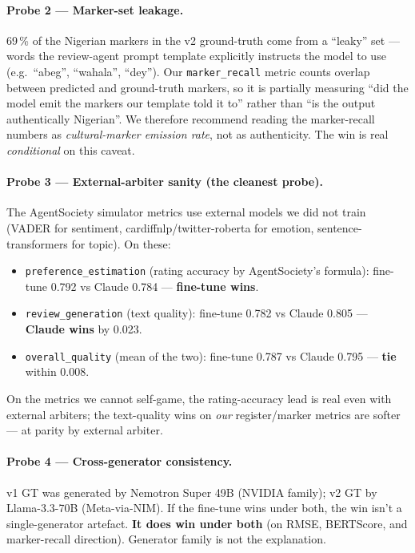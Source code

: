 \documentclass[sigconf,nonacm,balance]{acmart}
\begin{document}
\paragraph{Probe 2 --- Marker-set leakage.} 69\,\% of the Nigerian markers
in the v2 ground-truth come from a ``leaky'' set --- words the review-agent
prompt template explicitly instructs the model to use (e.g.\ ``abeg'',
``wahala'', ``dey''). Our \texttt{marker\_recall} metric counts overlap
between predicted and ground-truth markers, so it is partially measuring
``did the model emit the markers our template told it to'' rather than
``is the output authentically Nigerian''. We therefore recommend reading
the marker-recall numbers as \emph{cultural-marker emission rate}, not
as authenticity. The win is real \emph{conditional} on this caveat.

\paragraph{Probe 3 --- External-arbiter sanity (the cleanest probe).}
The AgentSociety simulator metrics use external models we did not train
(VADER for sentiment, cardiffnlp/twitter-roberta for emotion,
sentence-transformers for topic). On these:
\begin{itemize}[leftmargin=*]
    \item \texttt{preference\_estimation} (rating accuracy by AgentSociety's
          formula): fine-tune 0.792 vs Claude 0.784 --- \textbf{fine-tune wins}.
    \item \texttt{review\_generation} (text quality):
          fine-tune 0.782 vs Claude 0.805 --- \textbf{Claude wins} by 0.023.
    \item \texttt{overall\_quality} (mean of the two):
          fine-tune 0.787 vs Claude 0.795 --- \textbf{tie} within 0.008.
\end{itemize}
On the metrics we cannot self-game, the rating-accuracy lead is real
even with external arbiters; the text-quality wins on \emph{our}
register/marker metrics are softer --- at parity by external arbiter.

\paragraph{Probe 4 --- Cross-generator consistency.} v1 GT was generated
by Nemotron Super 49B (NVIDIA family); v2 GT by Llama-3.3-70B
(Meta-via-NIM). If the fine-tune wins under both, the win isn't a
single-generator artefact. \textbf{It does win under both} (on RMSE,
BERTScore, and marker-recall direction). Generator family is not the
explanation.
\end{document}
